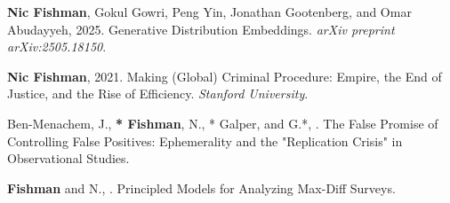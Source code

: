 \begin{cvparagraph}
\begin{addmargin}[2em]{0em}
\end{addmargin}


\begin{addmargin}[2em]{0em}

\textbf{Nic Fishman}, Gokul Gowri, Peng Yin, Jonathan Gootenberg, and Omar Abudayyeh, 2025. Generative Distribution Embeddings. \textit{arXiv preprint arXiv:2505.18150}.

\textbf{Nic Fishman}, 2021. Making (Global) Criminal Procedure: Empire, the End of Justice, and the Rise of Efficiency. \textit{Stanford University}.

Ben-Menachem, J., \textbf{* Fishman}, N., * Galper, and G.*, . The False Promise of Controlling False Positives: Ephemerality and the "Replication Crisis" in Observational Studies.

\textbf{Fishman} and N., . Principled Models for Analyzing Max-Diff Surveys.

\end{addmargin}

\end{cvparagraph}
